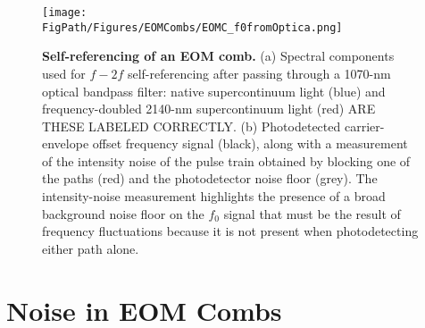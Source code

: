 \begin{figure}[htpb]
	\begin{center}
		\texttt{[image: \\FigPath/Figures/EOMCombs/EOMC\_f0fromOptica.png]}
	\end{center}
	\caption[Figure Title]{\textbf{Self-referencing of an EOM comb.} (a) Spectral components used for $f-2f$ self-referencing after passing through a 1070-nm optical bandpass filter: \color{red}native supercontinuum light (blue) and frequency-doubled 2140-nm supercontinuum light (red) ARE THESE LABELED CORRECTLY\color{black}. (b) Photodetected carrier-envelope offset frequency signal (black), along with a measurement of the intensity noise of the pulse train obtained by \color{red} blocking one of the paths (red) \color{black}and the photodetector noise floor (grey). \color{red}The intensity-noise measurement highlights the presence of a broad background noise floor  on the $f_0$ signal that must be the result of frequency fluctuations because it is not present when photodetecting either path alone.\color{black}}
	\label{fig:EOMC_f0}
\end{figure} 



\section{Noise in EOM Combs}

